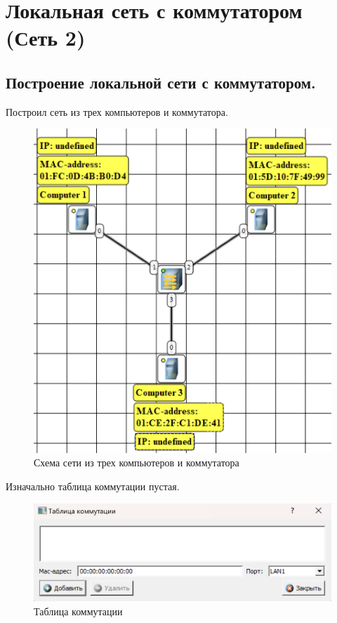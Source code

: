 \documentclass[12pt,onecolumn]{article}
\begin{document}
\section{Локальная сеть с коммутатором (Сеть 2)}
\subsection{Построение локальной сети с коммутатором.}
Построил сеть из трех компьютеров и коммутатора.
\begin{figure}[H]
  \centering
  \includegraphics[width=\textwidth]{image/part2/topology.png}
  \caption{Схема сети из трех компьютеров и коммутатора}
\end{figure}

Изначально таблица коммутации пустая.
\begin{figure}[H]
  \centering
  \includegraphics[width=\textwidth]{image/part2/switching-table.png}
  \caption{Таблица коммутации}
\end{figure}
\end{document}
